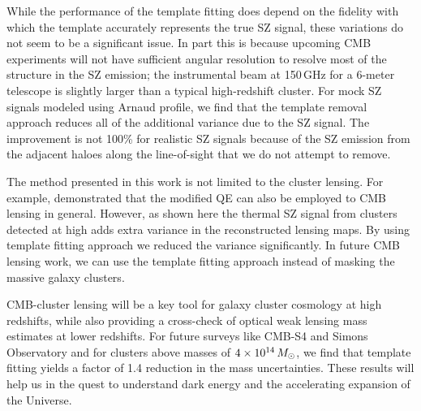 While the performance of the template fitting does depend on the fidelity with which the template accurately represents the true SZ signal, these variations do not seem to be a significant issue. 
In part this is because upcoming CMB experiments will not have sufficient angular resolution to resolve most of the structure in the SZ emission; the instrumental beam at 150\,GHz for a 6-meter telescope is slightly larger than a typical high-redshift cluster. 
For mock SZ signals modeled using Arnaud profile, we find that the template removal approach reduces all of the additional variance due to the SZ signal. 
The improvement is not 100\% for realistic SZ signals \citep{sehgal10, takahashi17} because of the SZ emission from the adjacent haloes along the line-of-sight that we do not attempt to remove. 

The method presented in this work is not limited to the cluster lensing. 
For example, \citet{madhavacheril18} demonstrated that the modified QE can also be employed to CMB lensing in general. 
However, as shown here the thermal SZ signal from clusters detected at high \snr{} adds extra variance in the reconstructed lensing maps. 
By using template fitting approach we reduced the variance significantly. 
In future CMB lensing work, we can use the template fitting approach instead of masking the massive galaxy clusters. 

CMB-cluster lensing will be a key tool for galaxy cluster cosmology at high redshifts, while also providing a cross-check of optical weak lensing mass estimates at lower redshifts. 
For future surveys like CMB-S4 and Simons Observatory and for clusters above masses of $4\times 10^{14}\,{M}_{\odot}$, we find that template fitting yields a factor of 1.4 reduction in the mass uncertainties. 
These results will help us in the quest to understand dark energy and the accelerating expansion of the Universe.



